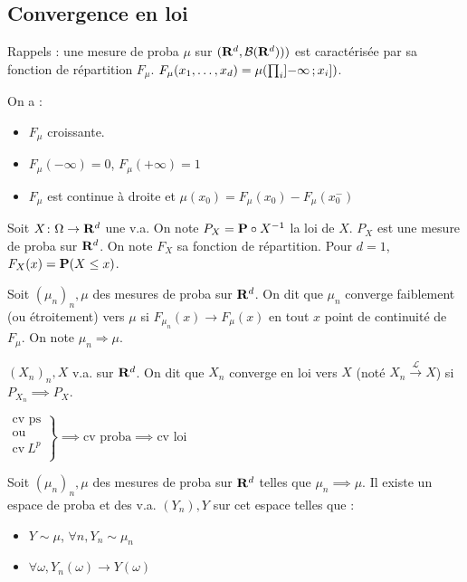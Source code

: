 \subsection{Convergence en loi}

	Rappels : une mesure de proba $\mu$ sur $(\mathbf{R}^d, \mathcal{B}(\mathbf{R}^d)))$ est caractérisée par sa fonction de répartition $F_\mu$.
	$F_\mu(x_1,\ldots,x_d) = \mu(\prod_i \mathopen{}\mathclose{\left]-\infty\mathclose{}\mathpunct{};x_i\right]})$.
	
	On a :
	\begin{itemize}
		\item[\textbullet] $F_\mu$ croissante.
		\item[\textbullet] $F_\mu(-\infty) = 0$, $F_\mu(+\infty) = 1$
		\item[\textbullet] $F_\mu$ est continue à droite et $\mu({x_0}) = F_\mu(x_0) - F_\mu(x_0^-)$
	\end{itemize}

	Soit $X \colon \Omega \to \mathbf{R}^d$ une v.a.
	On note $P_X = \mathbf{P} \circ X^{-1}$ la loi de $X$.
	$P_X$ est une mesure de proba sur $\mathbf{R}^d$.
	On note $F_X$ sa fonction de répartition.
	Pour $d = 1$, $F_X(x) = \mathbf{P}(X \leq x)$.
	
	\begin{defn}
		Soit $(\mu_n)_n, \mu$ des mesures de proba sur $\mathbf{R}^d$.
		On dit que $\mu_n$ converge faiblement (ou étroitement) vers $\mu$ si $F_{\mu_n}(x) \longrightarrow F_\mu(x)$ en tout $x$ point de continuité de $F_\mu$.
		On note $\mu_n \Rightarrow \mu$.
	\end{defn}

	\begin{defn}
		$(X_n)_n, X$ v.a. sur $\mathbf{R}^d$.
		On dit que $X_n$ converge en loi vers $X$ (noté $X_n \overset{\mathcal{L}}{\longrightarrow} X$) si $P_{X_n} \implies P_X$.
	\end{defn}

	\begin{pop}
		$\left. \begin{array}{r}
			\text{cv ps} \\
			\text{ou} \\
			\text{cv}\ L^p \\
		\end{array}\right\} \implies
		\text{cv proba} \implies
		\text{cv loi}$
	\end{pop}

	\begin{thm}
		Soit $(\mu_n)_n, \mu$ des mesures de proba sur $\mathbf{R}^d$ telles que $\mu_n \implies \mu$.
		Il existe un espace de proba et des v.a. $(Y_n), Y$ sur cet espace telles que :
		\begin{itemize}
			\item[\textbullet] $Y \sim \mu$, $\forall n, Y_n \sim \mu_n$
			\item[\textbullet] $\forall \omega, Y_n(\omega) \longrightarrow Y(\omega)$
		\end{itemize}
	\end{thm}

